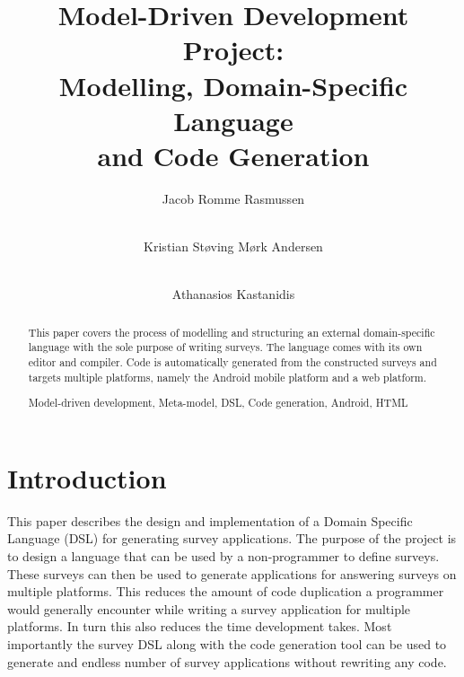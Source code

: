 \documentclass[runningheads]{llncs}
\newcommand{\keywords}[1]{\par\addvspace\baselineskip
\noindent\keywordname\enspace\ignorespaces#1}
\begin{document}
\mainmatter  %

\title{Model-Driven Development Project:\\ Modelling, Domain-Specific Language\\ and Code Generation}


\author{Jacob Romme Rasmussen \and \\ Kristian Støving Mørk Andersen \and \\ Athanasios Kastanidis}
%

\institute{\mailsa\\}

\maketitle


\begin{abstract}
This paper covers the process of modelling and structuring an external domain-specific language with the sole purpose of writing surveys. The language comes with its own editor and compiler. Code is automatically generated from the constructed surveys and targets multiple platforms, namely the Android mobile platform and a web platform. 
\keywords{Model-driven development, Meta-model, DSL, Code generation, Android, HTML}
\end{abstract}

\section{Introduction}

This paper describes the design and implementation of a Domain Specific Language (DSL) for generating survey applications. The purpose of the project is to design a language that can be used by a non-programmer to define surveys. These surveys can then be used to generate applications for answering surveys on multiple platforms. This reduces the amount of code duplication a programmer would generally encounter while writing a survey application for multiple platforms. In turn this also reduces the time development takes. Most importantly the survey DSL along with the code generation tool can be used to generate and endless number of survey applications without rewriting any code.
\end{document}
